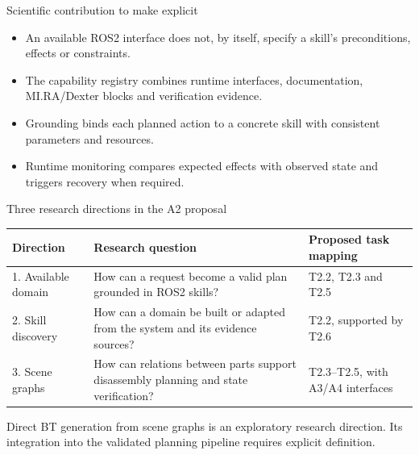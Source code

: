 \documentclass[aspectratio=169,11pt]{beamer}
\begin{document}
\begin{frame}{Scientific contribution to make explicit}
\begin{itemize}\items
\item An available ROS2 interface does not, by itself, specify a skill's preconditions, effects or constraints.
\item The capability registry combines runtime interfaces, documentation, MI.RA/Dexter blocks and verification evidence.
\item Grounding binds each planned action to a concrete skill with consistent parameters and resources.
\item Runtime monitoring compares expected effects with observed state and triggers recovery when required.
\end{itemize}
\end{frame}

\begin{frame}{Three research directions in the A2 proposal}
\small\renewcommand{\arraystretch}{1.35}
\begin{tabularx}{\textwidth}{@{}p{}XX@{}}
\toprule
Direction & Research question & Proposed task mapping\\\midrule
1. Available domain & How can a request become a valid plan grounded in ROS2 skills? & T2.2, T2.3 and T2.5\\
2. Skill discovery & How can a domain be built or adapted from the system and its evidence sources? & T2.2, supported by T2.6\\
3. Scene graphs & How can relations between parts support disassembly planning and state verification? & T2.3--T2.5, with A3/A4 interfaces\\\bottomrule
\end{tabularx}
\par\vspace{3mm}
Direct BT generation from scene graphs is an exploratory research direction. Its integration into the validated planning pipeline requires explicit definition.
\end{frame}
\end{document}
